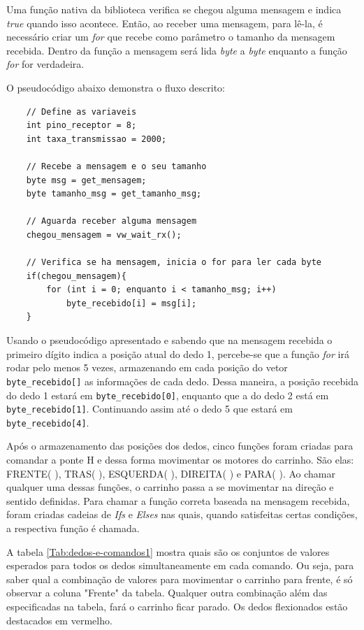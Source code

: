 \documentclass[
	12pt,				%
	openright,			%
	oneside,			%
	a4paper,			%
	english,			%
	brazil				%
	]{abntex2}
\begin{document}
		Uma função nativa da biblioteca verifica se chegou alguma mensagem e indica \textit{true} quando isso acontece. Então, ao receber uma mensagem, para lê-la, é necessário criar um \textit{for} que recebe como parâmetro o tamanho da mensagem recebida. Dentro da função a mensagem será lida \textit{byte} a \textit{byte} enquanto a função \textit{for} for verdadeira.

		O pseudocódigo abaixo demonstra o fluxo descrito:


\begin{lstlisting}
	// Define as variaveis
	int pino_receptor = 8;
	int taxa_transmissao = 2000;
	
	// Recebe a mensagem e o seu tamanho
	byte msg = get_mensagem;
	byte tamanho_msg = get_tamanho_msg;
	
	// Aguarda receber alguma mensagem
	chegou_mensagem = vw_wait_rx();

	// Verifica se ha mensagem, inicia o for para ler cada byte
	if(chegou_mensagem){
		for (int i = 0; enquanto i < tamanho_msg; i++)
			byte_recebido[i] = msg[i];		
	}
\end{lstlisting}

		Usando o pseudocódigo apresentado e sabendo que na mensagem recebida o primeiro dígito indica a posição atual do dedo 1, percebe-se que a função \textit{for} irá rodar pelo menos 5 vezes, armazenando em cada posição do vetor \texttt{byte\_recebido[]} as informações de cada dedo. Dessa maneira, a posição recebida do dedo 1 estará em \texttt{byte\_recebido[0]}, enquanto que a do dedo 2 está em \texttt{byte\_recebido[1]}. Continuando assim até o dedo 5 que estará em \texttt{byte\_recebido[4]}.
		
		Após o armazenamento das posições dos dedos, cinco funções foram criadas para comandar a ponte H e dessa forma movimentar os motores do carrinho. São elas: FRENTE( ), TRAS( ), ESQUERDA( ), DIREITA( ) e PARA( ). Ao chamar qualquer uma dessas funções, o carrinho passa a se movimentar na direção e sentido definidas.
		Para chamar a função correta baseada na mensagem recebida, foram criadas cadeias de \textit{Ifs} e \textit{Elses} nas quais, quando satisfeitas certas condições, a respectiva função é chamada. 
		
		A tabela \ref{Tab:dedos-e-comandos1} mostra quais são os conjuntos de valores esperados para todos os dedos simultaneamente em cada comando. Ou seja, para saber qual a combinação de valores para movimentar o carrinho para frente, é só observar a coluna "Frente" da tabela. Qualquer outra combinação além das especificadas na tabela, fará o carrinho ficar parado. Os dedos flexionados estão destacados em vermelho.
\end{document}

